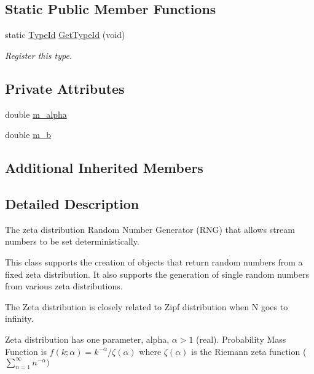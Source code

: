\subsection*{Static Public Member Functions}
\begin{DoxyCompactItemize}
\item 
static \hyperlink{classns3_1_1TypeId}{Type\+Id} \hyperlink{classns3_1_1ZetaRandomVariable_a54d5a7d6a24c100e4ed9207d9533fdcc}{Get\+Type\+Id} (void)
\begin{DoxyCompactList}\small\item\em Register this type. \end{DoxyCompactList}\end{DoxyCompactItemize}
\subsection*{Private Attributes}
\begin{DoxyCompactItemize}
\item 
double \hyperlink{classns3_1_1ZetaRandomVariable_a48ec2fea5e04864918b734f5ca4e5e07}{m\+\_\+alpha}
\item 
double \hyperlink{classns3_1_1ZetaRandomVariable_af07c02d30a8e7ffd8386b8776ef7b3ec}{m\+\_\+b}
\end{DoxyCompactItemize}
\subsection*{Additional Inherited Members}


\subsection{Detailed Description}
The zeta distribution Random Number Generator (R\+NG) that allows stream numbers to be set deterministically. 

This class supports the creation of objects that return random numbers from a fixed zeta distribution. It also supports the generation of single random numbers from various zeta distributions.

The Zeta distribution is closely related to Zipf distribution when N goes to infinity.

Zeta distribution has one parameter, alpha, $ \alpha > 1 $ (real). Probability Mass Function is $ f(k; \alpha) = k^{-\alpha}/\zeta(\alpha) $ where $ \zeta(\alpha) $ is the Riemann zeta function ( $ \sum_{n=1}^\infty n^{-\alpha} ) $

